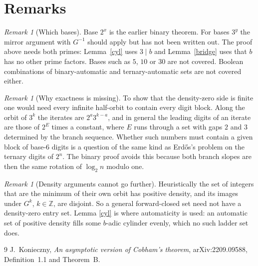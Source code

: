 \documentclass[11pt]{article}
\theoremstyle{remark}
\newtheorem{remark}[theorem]{Remark}
\begin{document}
\section{Remarks}

\begin{remark}[Which bases]\label{bases}
Base $2^x$ is the earlier binary theorem. For bases $3^y$ the mirror argument
with $G^{-1}$ should apply but has not been written out. The proof above needs
both primes: Lemma~\ref{cyl} uses $3\mid b$ and Lemma~\ref{bridge} uses that $b$
has no other prime factors. Bases such as $5$, $10$ or $30$ are not covered.
Boolean combinations of binary-automatic and ternary-automatic sets are not
covered either.
\end{remark}

\begin{remark}[Why exactness is missing]\label{gap}
To show that the density-zero side is finite one would need every infinite
half-orbit to contain every digit block. Along the orbit of $3^k$ the iterates
are $2^a3^{k-a}$, and in general the leading digits of an iterate are those of
$2^{E}$ times a constant, where $E$ runs through a set with gaps $2$ and $3$
determined by the branch sequence. Whether such numbers must contain a given
block of base-$6$ digits is a question of the same kind as Erd\H{o}s's problem
on the ternary digits of $2^n$. The binary proof avoids this because both
branch slopes are then the same rotation of $\log_2 n$ modulo one.
\end{remark}

\begin{remark}[Density arguments cannot go further]
Heuristically the set of integers that are the minimum of their own orbit has
positive density, and its images under $G^k$, $k\in\mathbb Z$, are disjoint. So
a general forward-closed set need not have a density-zero entry set. Lemma
\ref{cyl} is where automaticity is used: an automatic set of positive density
fills some $b$-adic cylinder evenly, which no such ladder set does.
\end{remark}

\begin{thebibliography}{9}
 J.~Konieczny, \emph{An asymptotic version of Cobham's theorem},
arXiv:2209.09588, Definition~1.1 and Theorem~B.
\end{thebibliography}
\end{document}
